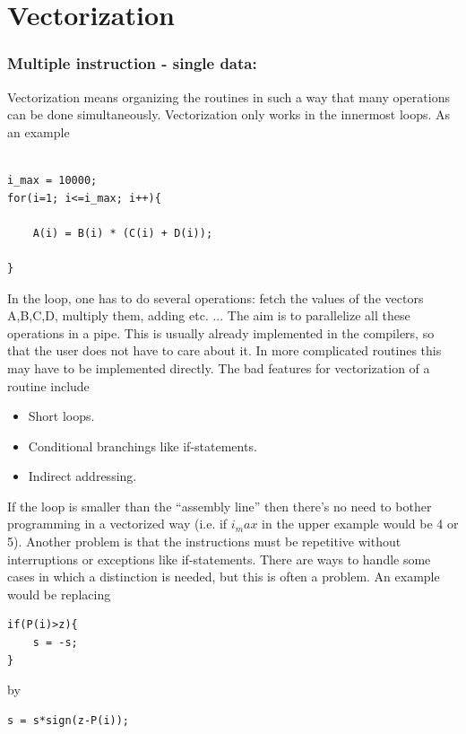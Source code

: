 

\section{Vectorization}

\subsubsection*{Multiple instruction - single data:}

Vectorization means organizing the routines in such a way that many operations can be done simultaneously. Vectorization only works in the innermost loops. As an example

\small
\begin{lstlisting}[frame=single]

i_max = 10000;
for(i=1; i<=i_max; i++){

	A(i) = B(i) * (C(i) + D(i));

}
\end{lstlisting}
\normalsize
In the loop, one has to do several operations: fetch the values of the vectors A,B,C,D, multiply them, adding etc. ... The aim is to parallelize all these operations in a pipe. This is usually already implemented in the compilers, so that the user does not have to care about it. In more complicated routines this may have to be implemented directly. The bad features for vectorization of a routine include

\begin{itemize}
\item Short loops.
\item Conditional branchings like if-statements.
\item Indirect addressing.
\end{itemize}

If the loop is smaller than the ``assembly line'' then there's no need to bother programming in a vectorized way (i.e. if $i_max$ in the upper example would be 4 or 5). Another problem is that the instructions must be repetitive without interruptions or exceptions like if-statements. There are ways to handle some cases in which a distinction is needed, but this is often a problem. An example would be replacing 
\small
\begin{lstlisting}[frame=single]
if(P(i)>z){
	s = -s;
}
\end{lstlisting}
\normalsize
by
 \small
\begin{lstlisting}[frame=single]
s = s*sign(z-P(i));
\end{lstlisting}
\normalsize


